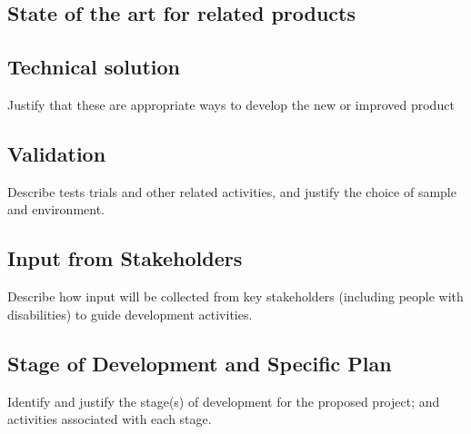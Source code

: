
\subsection{State of the art for related products}

\subsection{Technical solution}
Justify that these are appropriate ways to develop the new or improved product

\subsection{Validation}
Describe tests trials and other related activities, and justify the choice of sample and environment. 

\subsection{Input from Stakeholders}
Describe how input will be collected from key stakeholders (including people with disabilities) to guide development activities.

\subsection{Stage of Development and Specific Plan}

Identify and justify the stage(s) of development for the proposed project; and activities associated with each stage.